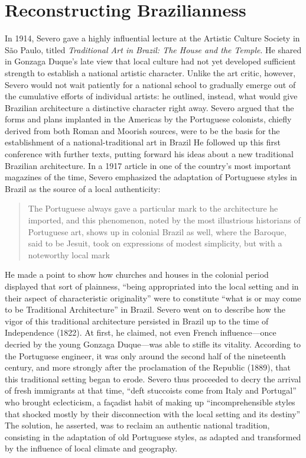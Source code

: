 \hypertarget{reconstructing-brazilianness}{%
\section{Reconstructing
Brazilianness}\label{reconstructing-brazilianness}}

In 1914, Severo gave a highly influential lecture at the Artistic
Culture Society in São Paulo, titled \emph{Traditional Art in Brazil:
The House and the Temple}. He shared in Gonzaga Duque's late view that
local culture had not yet developed sufficient strength to establish a
national artistic character. Unlike the art critic, however, Severo
would not wait patiently for a national school to gradually emerge out
of the cumulative efforts of individual artists: he outlined, instead,
what would give Brazilian architecture a distinctive character right
away. Severo argued that the forms and plans implanted in the Americas
by the Portuguese colonists, chiefly derived from both Roman and Moorish
sources, were to be the basis for the establishment of a
national-traditional art in Brazil \autocite[p.~249]{azevedo:1994ideas}
He followed up this first conference with further texts, putting forward
his ideas about a new traditional Brazilian architecture. In a 1917
article in one of the country's most important magazines of the time,
Severo emphasized the adaptation of Portuguese styles in Brazil as the
source of a local authenticity:

\begin{quote}
The Portuguese always gave a particular mark to the architecture he
imported, and this phenomenon, noted by the most illustrious historians
of Portuguese art, shows up in colonial Brazil as well, where the
Baroque, said to be Jesuit, took on expressions of modest simplicity,
but with a noteworthy local mark \autocite[p. 402]{severo:1917arte}
\end{quote}

He made a point to show how churches and houses in the colonial period
displayed that sort of plainness, ``being appropriated into the local
setting and in their aspect of characteristic originality'' were to
constitute ``what is or may come to be Traditional Architecture'' in
Brazil. Severo went on to describe how the vigor of this traditional
architecture persisted in Brazil up to the time of Independence (1822).
At first, he claimed, not even French influence---once decried by the
young Gonzaga Duque---was able to stifle its vitality. According to the
Portuguese engineer, it was only around the second half of the
nineteenth century, and more strongly after the proclamation of the
Republic (1889), that this traditional setting began to erode. Severo
thus proceeded to decry the arrival of fresh immigrants at that time,
``deft stuccoists come from Italy and Portugal'' who brought
eclecticism, a façadist habit of making up ``incomprehensible styles
that shocked mostly by their disconnection with the local setting and
its destiny'' \autocite[p.~415]{severo:1917arte} The solution, he
asserted, was to reclaim an authentic national tradition, consisting in
the adaptation of old Portuguese styles, as adapted and transformed by
the influence of local climate and geography.

